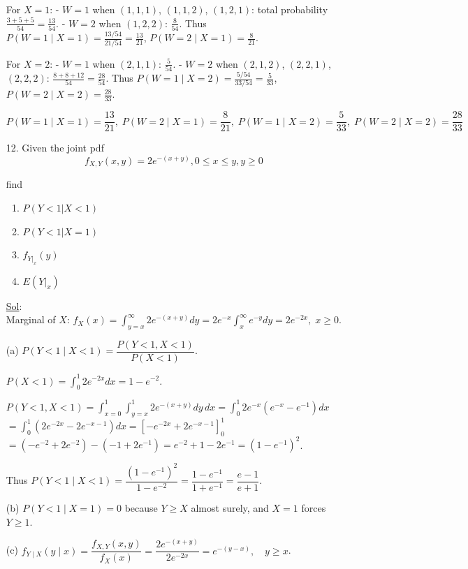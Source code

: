\begin{enumerate}
	      For \(X=1\):
	      - \(W=1\) when \((1,1,1)\), \((1,1,2)\), \((1,2,1)\): total probability \(\frac{3+5+5}{54}=\frac{13}{54}\).
	      - \(W=2\) when \((1,2,2)\): \(\frac{8}{54}\).
	      Thus \(P(W=1\mid X=1)=\frac{13/54}{21/54}=\frac{13}{21}\), \(P(W=2\mid X=1)=\frac{8}{21}\).

	      For \(X=2\):
	      - \(W=1\) when \((2,1,1)\): \(\frac{5}{54}\).
	      - \(W=2\) when \((2,1,2)\), \((2,2,1)\), \((2,2,2)\): \(\frac{8+8+12}{54}=\frac{28}{54}\).
	      Thus \(P(W=1\mid X=2)=\frac{5/54}{33/54}=\frac{5}{33}\), \(P(W=2\mid X=2)=\frac{28}{33}\).

	      \[
		      \boxed{P(W=1\mid X=1)=\frac{13}{21},\; P(W=2\mid X=1)=\frac{8}{21},\; P(W=1\mid X=2)=\frac{5}{33},\; P(W=2\mid X=2)=\frac{28}{33}}
	      \]

	\item[12.] Given the joint pdf
	      \[
		      f_{X, Y} (x, y) = 2e^{-(x+y)}, 0 \leq x \leq y, y \geq 0
	      \]

	      find
	      \begin{enumerate}
		      \item \(P(Y < 1 | X < 1)\)
		      \item \(P(Y < 1 | X = 1)\)
		      \item \(f_{Y|_x} (y)\)
		      \item \(E(Y |_x)\)
	      \end{enumerate}

	      \underline{Sol}: \\

	      Marginal of \(X\): \(f_X(x)=\int_{y=x}^\infty 2e^{-(x+y)}dy=2e^{-x}\int_x^\infty e^{-y}dy=2e^{-2x},\;x\ge0\).

	      (a) \(P(Y<1\mid X<1)=\dfrac{P(Y<1,X<1)}{P(X<1)}\).

	      \(P(X<1)=\int_0^1 2e^{-2x}dx=1-e^{-2}\).

	      \(P(Y<1,X<1)=\int_{x=0}^1\int_{y=x}^1 2e^{-(x+y)}dy\,dx=\int_0^1 2e^{-x}(e^{-x}-e^{-1})dx\)
	      \(=\int_0^1(2e^{-2x}-2e^{-x-1})dx=[-e^{-2x}+2e^{-x-1}]_0^1\)
	      \(=(-e^{-2}+2e^{-2})-(-1+2e^{-1})=e^{-2}+1-2e^{-1}=(1-e^{-1})^2\).

	      Thus \(P(Y<1\mid X<1)=\dfrac{(1-e^{-1})^2}{1-e^{-2}}=\dfrac{1-e^{-1}}{1+e^{-1}}=\dfrac{e-1}{e+1}\).

	      (b) \(P(Y<1\mid X=1)=0\) because \(Y\ge X\) almost surely, and \(X=1\) forces \(Y\ge1\).

	      (c) \(f_{Y\mid X}(y\mid x)=\dfrac{f_{X,Y}(x,y)}{f_X(x)}=\dfrac{2e^{-(x+y)}}{2e^{-2x}}=e^{-(y-x)},\quad y\ge x\).


\end{enumerate}
